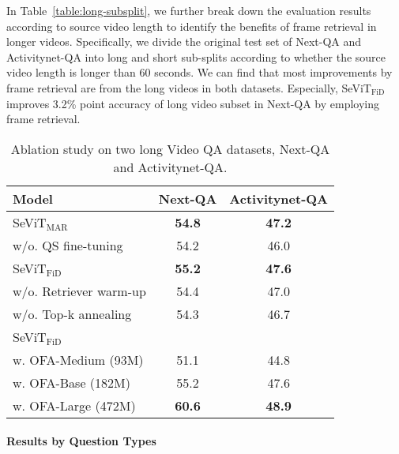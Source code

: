 \documentclass{article}
\newcommand{\frameworkname}{SeViT}
\begin{document}
In Table~\ref{table:long-subsplit}, we further break down the evaluation results according to source video length to identify the benefits of frame retrieval in longer videos. Specifically, we divide the original test set of Next-QA and Activitynet-QA into long and short sub-splits according to whether the source video length is longer than 60 seconds. We can find that most improvements by frame retrieval are from the long videos in both datasets. Especially, \frameworkname{}$_\text{FiD}$ improves 3.2\% point accuracy of long video subset in Next-QA by employing frame retrieval.

\begin{table}[t!]
    \centering
    \small
    \caption{Ablation study on two long Video QA datasets, Next-QA and Activitynet-QA.}
    \vskip 0.15in
\begin{tabular}{lcc}
        \toprule
        Model & Next-QA & Activitynet-QA \\
        \midrule
        \frameworkname{}$_\text{MAR}$ & \textbf{54.8} & \textbf{47.2} \\
        \quad w/o. QS fine-tuning & 54.2 & 46.0 \\
        \midrule
        \frameworkname{}$_\text{FiD}$ & \textbf{55.2} & \textbf{47.6} \\
        \quad w/o. Retriever warm-up & 54.4 & 47.0 \\
        \quad w/o. Top-k annealing & 54.3 & 46.7 \\
        \midrule
        \frameworkname{}$_\text{FiD}$ & &  \\
        \quad w. OFA-Medium \small{(93M)} & 51.1 & 44.8 \\
        \quad w. OFA-Base \small{(182M)} & 55.2 & 47.6 \\
        \quad w. OFA-Large \small{(472M)} & \textbf{60.6} & \textbf{48.9} \\
        
        \bottomrule
    \end{tabular}


    \label{table:ablation_study}
\end{table} 
\paragraph{Results by Question Types}
\end{document}
